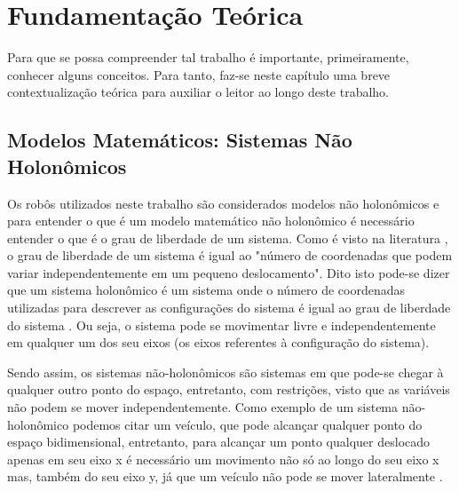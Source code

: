 %
%

\chapter{Fundamentação Teórica}
\label{chap:fundamentacaoTeorica}
Para que se possa %
compreender tal trabalho é importante, primeiramente, conhecer alguns conceitos. Para tanto, faz-se neste capítulo uma breve contextualização teórica para auxiliar o leitor ao longo deste trabalho. 

\section{Modelos Matemáticos: Sistemas Não Holonômicos}
\label{sec:modeloMatematicoNHolonomico}
Os robôs utilizados neste trabalho são considerados modelos não holonômicos e para entender o que é um modelo matemático não holonômico é necessário entender o que é o grau de liberdade de um sistema. Como é visto na literatura \cite{TJRD13}, o grau de liberdade de um sistema é igual ao "número de coordenadas que podem variar independentemente em um pequeno deslocamento". Dito isto pode-se dizer que um sistema holonômico é um sistema onde o número de coordenadas utilizadas para descrever as configurações do sistema é igual ao grau de liberdade do sistema \cite{TJRD13}. Ou seja, o sistema pode se movimentar livre e independentemente em qualquer um dos seu eixos (os eixos referentes à configuração do sistema).

Sendo assim, os sistemas não-holonômicos são sistemas em que pode-se chegar à qualquer outro ponto do espaço, entretanto, com restrições, visto que as variáveis não podem se mover independentemente. Como exemplo de um sistema não-holonômico podemos citar um veículo, que pode alcançar qualquer ponto do espaço bidimensional, entretanto, para alcançar um ponto qualquer deslocado apenas em seu eixo x é necessário um movimento não só ao longo do seu eixo x mas, também do seu eixo y, já que um veículo não pode se mover lateralmente \cite{GJA11}.

